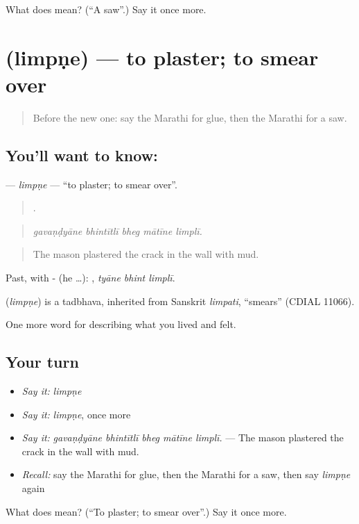 \begin{tcolorbox}[breakable,colback=teal!4,colframe=teal!35!black,title={Before you move on}]
What does  mean? (\textquotedblleft{}A saw\textquotedblright{}.) Say it once more.
\end{tcolorbox}
\section[\texorpdfstring{\mr{लिंपणे} (limpṇe)}{लिंपणे (limpṇe)}]{ (limpṇe) — to plaster; to smear over}

\label{lesson:MR-C521-limpne}



\begin{quote}
Before the new one: say the Marathi for glue, then the Marathi for a saw.
\end{quote}

\subsection*{You'll want to know: }
\textbf{} — \emph{limpṇe} — \textquotedblleft{}to plaster; to smear over\textquotedblright{}.

\begin{quote}
    .
\end{quote}

\begin{quote}
\emph{gavaṇḍyāne bhintītlī bheg mātīne limplī.}
\end{quote}

\begin{quote}
The mason plastered the crack in the wall with mud.
\end{quote}

Past, with - (he …):   , \emph{tyāne bhint limplī}.

\begin{cousinweb}
\textbf{} (\emph{limpṇe}) is a tadbhava, inherited from Sanskrit \emph{limpati}, \textquotedblleft{}smears\textquotedblright{} (CDIAL 11066).
\end{cousinweb}

\begin{grammarlens}[title={What you've built}]
One more word for describing what you lived and felt.
\end{grammarlens}

\subsection*{Your turn}
\begin{itemize}
\raggedright
  \item \emph{Say it:} \emph{limpṇe}
  \item \emph{Say it:} \emph{limpṇe}, once more
  \item \emph{Say it:} \emph{gavaṇḍyāne bhintītlī bheg mātīne limplī.} — The mason plastered the crack in the wall with mud.
  \item \emph{Recall:} say the Marathi for glue, then the Marathi for a saw, then say \emph{limpṇe} again
\end{itemize}

\begin{tcolorbox}[breakable,colback=teal!4,colframe=teal!35!black,title={Before you move on}]
What does  mean? (\textquotedblleft{}To plaster; to smear over\textquotedblright{}.) Say it once more.
\end{tcolorbox}
